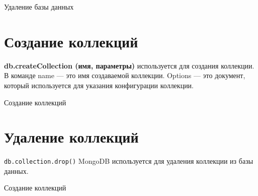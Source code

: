 \begin{image}
	\caption{Удаление базы данных}
	\label{fig:drop:db}
\end{image}

\clearpage
\section{Создание коллекций}

\textbf{db.createCollection (имя, параметры)} используется для создания
коллекции.
В команде name --- это имя создаваемой коллекции. Options — это
документ, который используется для указания конфигурации коллекции.

\begin{image}
	\caption{Создание коллекций}
	\label{fig:create:collection}
\end{image}

\clearpage
\section{Удаление коллекций}

\texttt{db.collection.drop()} MongoDB используется для удаления коллекции из
базы данных.

\begin{image}
	\caption{Создание коллекций}
	\label{fig:create:collection}
\end{image}

\clearpage
